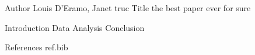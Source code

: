 Author Louis D'Eramo, Janet truc
Title the best paper ever for sure

Introduction
Data
Analysis
Conclusion 

References 
ref.bib